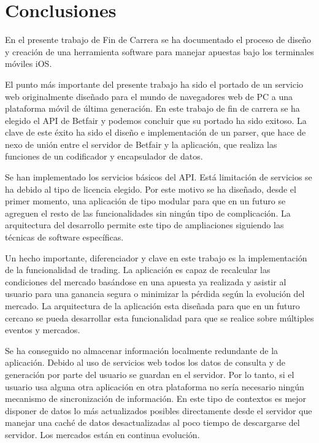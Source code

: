 \chapter{Conclusiones}
\label{ch:conclusiones}

 En el presente trabajo de Fin de Carrera se ha documentado el proceso de diseño y  creación de una herramienta software para manejar apuestas bajo los terminales móviles iOS. 
 
El punto más importante del presente trabajo ha sido el portado de un servicio web originalmente diseñado para el mundo de navegadores web de PC a una plataforma móvil de última generación. En este trabajo de fin de carrera se ha elegido el API de Betfair y podemos concluir que su portado ha sido exitoso. La clave de este éxito ha sido el diseño e implementación de un parser, que hace de nexo de unión entre el servidor de Betfair y la aplicación, que realiza las funciones de un codificador y encapsulador de datos.
 
 Se han implementado los servicios básicos del API. Está limitación de servicios se ha debido al tipo de licencia elegido. Por este motivo se ha diseñado, desde el primer momento, una aplicación de tipo modular para que en un futuro se agreguen el resto de las funcionalidades sin ningún tipo de complicación. La arquitectura del desarrollo permite este tipo de ampliaciones siguiendo las técnicas de software específicas.
 
 Un hecho importante, diferenciador y clave en este trabajo es la implementación de la funcionalidad de trading. La aplicación es capaz de recalcular las condiciones del mercado basándose en una apuesta ya realizada y asistir al usuario para una ganancia segura o minimizar la pérdida según la evolución del mercado. La arquitectura de la aplicación esta diseñada para que en un futuro cercano se pueda desarrollar esta funcionalidad para que se realice sobre múltiples eventos y mercados.
 
 Se ha conseguido no almacenar información localmente redundante de la aplicación. Debido al uso de servicios web todos los datos de consulta y de generación por parte del usuario se guardan en el servidor. Por lo tanto, si el usuario usa alguna otra aplicación en otra plataforma no sería necesario ningún mecanismo de sincronización de información. En este tipo de contextos es mejor disponer de datos lo más actualizados posibles directamente desde el servidor que manejar una caché de datos desactualizadas al poco tiempo de descargarse del servidor. Los mercados están en continua evolución.
 
